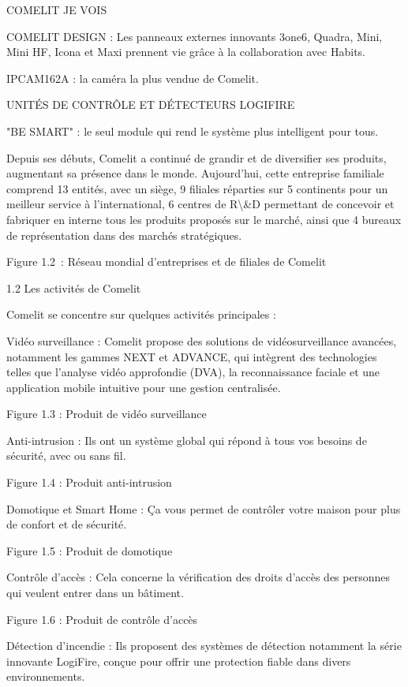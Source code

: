 \documentclass{article}
\begin{document}
COMELIT JE VOIS 

COMELIT DESIGN : Les panneaux externes innovants 3one6, Quadra, Mini, Mini HF, Icona et Maxi prennent vie grâce à la collaboration avec Habits. 

IPCAM162A : la caméra la plus vendue de Comelit.

UNITÉS DE CONTRÔLE ET DÉTECTEURS LOGIFIRE 

"BE SMART" : le seul module qui rend le système plus intelligent pour tous.

Depuis ses débuts, Comelit a continué de grandir et de diversifier ses produits, augmentant sa présence dans le monde. Aujourd'hui, cette entreprise familiale comprend 13 entités, avec un siège, 9 filiales réparties sur 5 continents pour un meilleur service à l'international, 6 centres de R\textbackslash{}&D permettant de concevoir et fabriquer en interne tous les produits proposés sur le marché, ainsi que 4 bureaux de représentation dans des marchés stratégiques.

Figure 1.2 : Réseau mondial d’entreprises et de filiales de Comelit

1.2 Les activités de  Comelit 

Comelit se concentre sur quelques activités principales :

Vidéo surveillance : Comelit propose des solutions de vidéosurveillance avancées, notamment les gammes NEXT et ADVANCE, qui intègrent des technologies telles que l'analyse vidéo approfondie (DVA), la reconnaissance faciale et une application mobile intuitive pour une gestion centralisée.

Figure 1.3 : Produit de vidéo surveillance

Anti-intrusion : Ils ont un système global qui répond à tous vos besoins de sécurité, avec ou sans fil.

Figure 1.4 : Produit anti-intrusion

Domotique et Smart Home : Ça vous permet de contrôler votre maison pour plus de confort et de sécurité.

Figure 1.5 : Produit de domotique

Contrôle d’accès : Cela concerne la vérification des droits d'accès des personnes qui veulent entrer dans un bâtiment. 

Figure 1.6 : Produit de contrôle d’accès

Détection d'incendie : Ils proposent des systèmes de détection notamment la série innovante LogiFire, conçue pour offrir une protection fiable dans divers environnements. 
\end{document}
